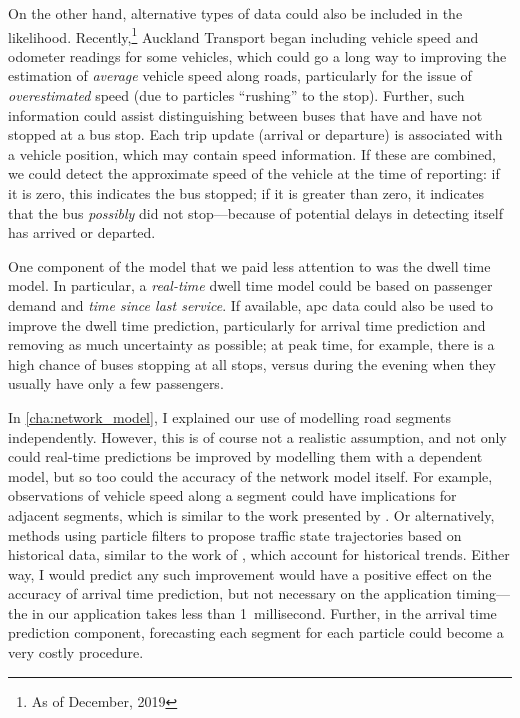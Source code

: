 On the other hand, alternative types of data could also be included in the likelihood. Recently,\footnote{As of December, 2019} Auckland Transport began including vehicle speed and odometer readings for some vehicles, which could go a long way to improving the estimation of \emph{average} vehicle speed along roads, particularly for the issue of \emph{overestimated} speed (due to particles ``rushing'' to the stop). Further, such information could assist distinguishing between buses that have and have not stopped at a bus stop. Each trip update (arrival or departure) is associated with a vehicle position, which may contain speed information. If these are combined, we could detect the approximate speed of the vehicle at the time of reporting: if it is zero, this indicates the bus stopped; if it is greater than zero, it indicates that the bus \emph{possibly} did not stop---because of potential delays in detecting itself has arrived or departed.


One component of the model that we paid less attention to was the dwell time model. In particular, a \emph{real-time} dwell time model could be based on passenger demand and \emph{time since last service}. If available, \gls{apc} data could also be used to improve the dwell time prediction, particularly for arrival time prediction and removing as much uncertainty as possible; at peak time, for example, there is a high chance of buses stopping at all stops, versus during the evening when they usually have only a few passengers.



In \cref{cha:network_model}, I explained our use of modelling road segments independently. However, this is of course not a realistic assumption, and not only could real-time predictions be improved by modelling them with a dependent model, but so too could the accuracy of the network model itself. For example, observations of vehicle speed along a segment could have implications for adjacent segments, which is similar to the work presented by \citet{Julio_2016}. Or alternatively, methods using particle filters to propose traffic state trajectories based on historical data, similar to the work of \citet{Chen_2014}, which account for historical trends. Either way, I would predict any such improvement would have a positive effect on the accuracy of arrival time prediction, but not necessary on the application timing---the \kf{} in our application takes less than 1~millisecond. Further, in the arrival time prediction component, forecasting each segment for each particle could become a very costly procedure.


